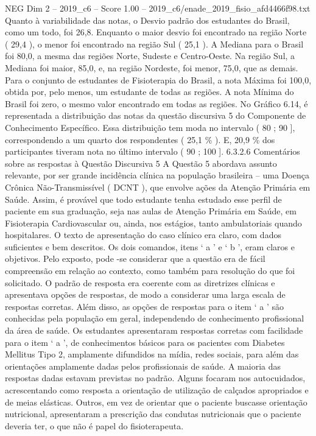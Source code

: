 \begin{textsample}{NEG Dim 2 – 2019\_c6 – Score 1.00 – 2019\_c6/enade\_2019\_fisio\_afd4466f98.txt}
Quanto à variabilidade das notas, o Desvio padrão dos estudantes do Brasil, como um todo, foi 26,8.
Enquanto o maior desvio foi encontrado na região Norte ( 29,4 ), o menor foi encontrado na região Sul ( 25,1 ).
A Mediana para o Brasil foi 80,0, a mesma das regiões Norte, Sudeste e Centro-Oeste.
Na região Sul, a Mediana foi maior, 85,0, e, na região Nordeste, foi menor, 75,0, que as demais.
Para o conjunto de estudantes de Fisioterapia do Brasil, a nota Máxima foi 100,0, obtida por, pelo menos, um estudante de todas as regiões.
A nota Mínima do Brasil foi zero, o mesmo valor encontrado em todas as regiões.
No Gráfico 6.14, é representada a distribuição das notas da questão discursiva 5 do Componente de Conhecimento Específico.
Essa distribuição tem moda no intervalo ( 80 ; 90 ], correspondendo a um quarto dos respondentes ( 25,1 \% ).
E, 20,9 \% dos participantes tiveram nota no último intervalo ( 90 ; 100 ]. 6.3.2.6 Comentários sobre as respostas à Questão Discursiva 5 A Questão 5 abordava assunto relevante, por ser grande incidência clínica na população brasileira – uma Doença Crônica Não-Transmissível ( DCNT ), que envolve ações da Atenção Primária em Saúde.
Assim, é provável que todo estudante tenha estudado esse perfil de paciente em sua graduação, seja nas aulas de Atenção Primária em Saúde, em Fisioterapia Cardiovascular ou, ainda, nos estágios, tanto ambulatoriais quando hospitalares.
O texto de apresentação do caso clínico era claro, com dados suficientes e bem descritos.
Os dois comandos, itens ‘ a ’ e ‘ b ’, eram claros e objetivos.
Pelo exposto, pode -se considerar que a questão era de fácil compreensão em relação ao contexto, como também para resolução do que foi solicitado.
O padrão de resposta era coerente com as diretrizes clínicas e apresentava opções de respostas, de modo a considerar uma larga escala de respostas corretas.
Além disso, as opções de respostas para o item ‘ a ’ são conhecidas pela população em geral, independendo de conhecimento profissional da área de saúde.
Os estudantes apresentaram respostas corretas com facilidade para o item ‘ a ’, de conhecimentos básicos para os pacientes com Diabetes Mellitus Tipo 2, amplamente difundidos na mídia, redes sociais, para além das orientações amplamente dadas pelos profissionais de saúde.
A maioria das respostas dadas estavam previstas no padrão.
Alguns focaram nos autocuidados, acrescentando como resposta a orientação de utilização de calçados apropriados e de meias elásticas.
Outros, em vez de orientar que o paciente buscasse orientação nutricional, apresentaram a prescrição das condutas nutricionais que o paciente deveria ter, o que não é papel do fisioterapeuta.

\end{textsample}
